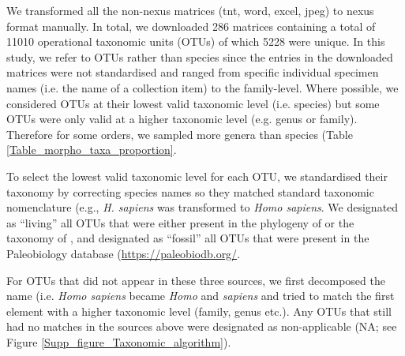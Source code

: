We transformed all the non-nexus matrices (tnt, word, excel, jpeg) to nexus format manually.
In total, we downloaded 286 matrices containing a total of 11010 operational taxonomic units (OTUs) of which 5228 were unique.
In this study, we refer to OTUs rather than species since the entries in the downloaded matrices were not standardised and ranged from specific individual specimen names (i.e. the name of a collection item) to the family-level.
Where possible, we considered OTUs at their lowest valid taxonomic level (i.e. species) but some OTUs were only valid at a higher taxonomic level (e.g. genus or family).
Therefore for some orders, we sampled more genera than species (Table \ref{Table_morpho_taxa_proportion}.

To select the lowest valid taxonomic level for each OTU, we standardised their taxonomy by correcting species names so they matched standard taxonomic nomenclature (e.g., \textit{H. sapiens} was transformed to \textit{Homo sapiens}.
We designated as ``living'' all OTUs that were either present in the phylogeny of \citep{BinindaEmonds} or the taxonomy of \citep{wilson2005mammal}, and designated as ``fossil'' all OTUs that were present in the Paleobiology database (\url{https://paleobiodb.org/}.

For OTUs that did not appear in these three sources, we first decomposed the name (i.e. \textit{Homo sapiens} became \textit{Homo} and \textit{sapiens} and tried to match the first element with a higher taxonomic level (family, genus etc.).
Any OTUs that still had no matches in the sources above were designated as non-applicable (NA; see Figure \ref{Supp_figure_Taxonomic_algorithm}).

